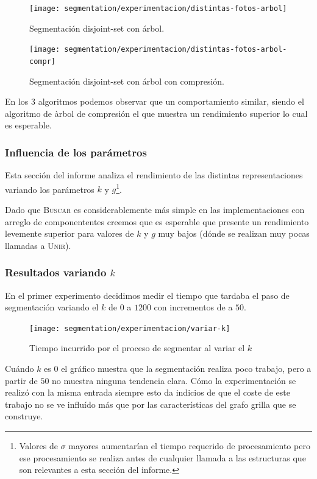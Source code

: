 \begin{figure}[H]
	\centering
	\texttt{[image: segmentation/experimentacion/distintas-fotos-arbol]}
	\caption{Segmentación disjoint-set con árbol.}
\end{figure}

\begin{figure}[H]
	\centering
	\texttt{[image: segmentation/experimentacion/distintas-fotos-arbol-compr]}
	\caption{Segmentación disjoint-set con árbol con compresión.}
\end{figure}

En los 3 algoritmos podemos observar que un comportamiento similar, siendo el algoritmo de àrbol de compresión el que muestra un rendimiento superior lo cual es esperable.


\subsubsection{Influencia de los parámetros}

Esta sección del informe analiza el rendimiento de las distintas
representaciones variando los parámetros $k$ y $g$\footnote{Valores de $\sigma$
mayores aumentarían el tiempo requerido de procesamiento pero ese procesamiento
se realiza antes de cualquier llamada a las estructuras que son relevantes a
esta sección del informe.}.

Dado que \textsc{Buscar} es considerablemente más simple en las
implementaciones con arreglo de componententes creemos que es esperable que
presente un rendimiento levemente superior para valores de $k$ y $g$ muy bajos
(dónde se realizan muy pocas llamadas a \textsc{Unir}).

\subsubsection{Resultados variando $k$}

En el primer experimento decidimos medir el tiempo que tardaba el paso de
segmentación variando el $k$ de $0$ a $1200$ con incrementos de a $50$.

\begin{figure}[h]
	\centering
	\texttt{[image: segmentation/experimentacion/variar-k]}
	\caption{Tiempo incurrido por el proceso de segmentar al variar el $k$}
\end{figure}

Cuándo $k$ es $0$ el gráfico muestra que la segmentación realiza poco trabajo,
pero a partir de $50$ no muestra ninguna tendencia clara. Cómo la
experimentación se realizó con la misma entrada siempre esto da indicios de que
el coste de este trabajo no se ve influído más que por las características del
grafo grilla que se construye.

